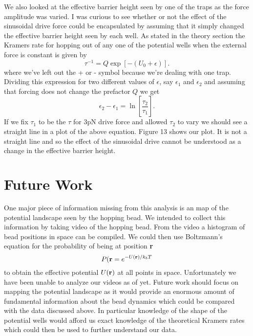 \documentclass{report}
\begin{document}
We also looked at the effective barrier height seen by one of the traps as the force amplitude was varied. I was curious to see whether or not the effect of the sinusoidal drive force could be encapsulated by assuming that it simply changed the effective barrier height seen by each well. As stated in the theory section the Kramers rate for hopping out of any one of the potential wells when the external force is constant is given by
\begin{displaymath}
\tau^{-1} = Q \exp\left[-(U_0 + \epsilon )\right].
\end{displaymath}
where we've left out the + or - symbol because we're dealing with one trap. Dividing this expression for two different values of $\epsilon$, say $\epsilon_1$ and $\epsilon_2$ and assuming that forcing does not change the prefactor $Q$ we get
\begin{displaymath}
\epsilon_2-\epsilon_1 = \ln \left[ \frac{\tau_2}{\tau_1} \right] .
\end{displaymath}
If we fix $\tau_1$ to be the $\tau$ for 3pN drive force and allowed $\tau_2$ to vary we should see a straight line in a plot of the above equation. Figure 13 shows our plot. It is not a straight line and so the effect of the sinusoidal drive cannot be understood as a change in the effective barrier height.

\section{Future Work}

One major piece of information missing from this analysis is an map of the potential landscape seen by the hopping bead. We intended to collect this information by taking video of the hopping bead. From the video a histogram of bead positions in space can be compiled. We could then use Boltzmann's equation for the probability of being at position \textbf{r}
\begin{displaymath}
P(\textrm{\textbf{r}} = e^{-U(\textrm{\textbf{r}})/k_bT}
\end{displaymath}
to obtain the effective potential $U(\textrm{\textbf{r}})$ at all points in space. Unfortunately we have been unable to analyze our videos as of yet. Future work should focus on mapping the potential landscape as it would provide an enormous amount of fundamental information about the bead dynamics which could be compared with the data discussed above. In particular knowledge of the shape of the potential wells would afford us exact knowledge of the theoretical Kramers rates which could then be used to further understand our data.
\end{document}
